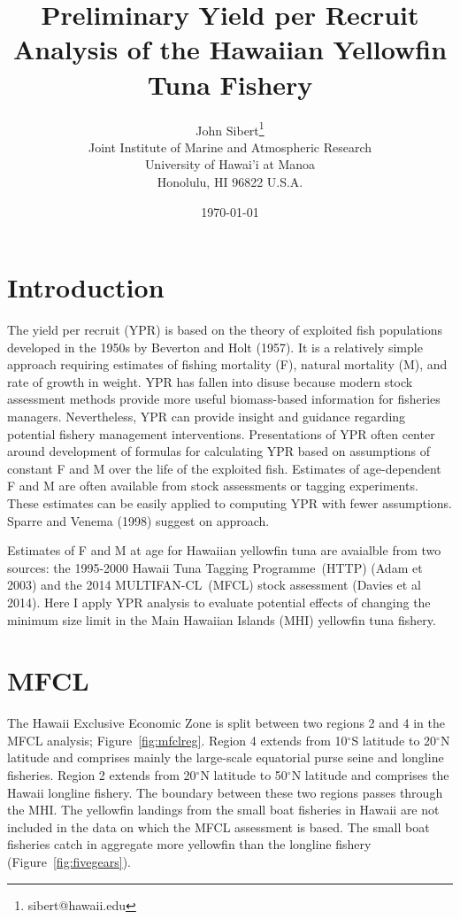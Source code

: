 \documentclass[12pt,letterpaper]{article}
\title{Preliminary Yield per Recruit Analysis of the Hawaiian
Yellowfin Tuna Fishery}
\author{
John Sibert\thanks{sibert@hawaii.edu}\\
Joint Institute of Marine and Atmospheric Research\\
University of Hawai'i at Manoa\\
Honolulu, HI  96822 U.S.A.\\[0.125in]
\date{\today}
}
\newcommand\doublespacing{\baselineskip=1.6\normalbaselineskip}
\renewcommand\deg[1]{$^\circ$#1}
\newcommand\MFCL{MULTIFAN-CL}
\newcommand\HTTP{Hawaii Tuna Tagging Programme}
\newcommand\help[1]{\color{Magenta}{\it #1 }\normalcolor}
\begin{document}
\maketitle

\doublespacing

\section*{Introduction}
The yield per recruit (YPR) is based on the theory of exploited fish
populations developed in the 1950s
by Beverton and Holt (1957). It is a relatively simple
approach requiring estimates of fishing mortality (F), natural
mortality (M), and rate of growth in weight. YPR has fallen into
disuse because modern stock assessment methods provide more useful
biomass-based
information for fisheries managers. 
Nevertheless, YPR can provide insight and guidance regarding potential
fishery management interventions.
Presentations of
YPR often center around development of formulas for calculating YPR based on
assumptions of constant F and M over the life of the exploited fish.
Estimates of age-dependent F and M are often available from stock
assessments or tagging experiments. These estimates can be easily
applied to computing YPR with fewer assumptions. Sparre and Venema
(1998) suggest on approach.

Estimates of F and M at age for Hawaiian yellowfin tuna are avaialble
from two sources: the 1995-2000 \HTTP\ (HTTP) (Adam et 2003) and the
2014 \MFCL\ (MFCL) stock assessment (Davies et al 2014). Here I
apply YPR analysis to evaluate potential effects of changing the
minimum size limit in the Main Hawaiian Islands (MHI) yellowfin tuna
fishery.

\section*{MFCL}
The Hawaii Exclusive Economic Zone is split between two regions 2 and 4
in the MFCL analysis; Figure~\ref{fig:mfclreg}. 
Region 4 extends from
10\deg{S} latitude to 20\deg{N} latitude and comprises mainly
the large-scale equatorial purse seine and longline fisheries.
Region 2 extends from 20\deg{N} latitude to 50\deg{N} latitude
and comprises the Hawaii longline fishery.
The boundary between these two regions passes through the MHI. 
The yellowfin landings from the small boat fisheries in Hawaii are not
included in the data on which the MFCL assessment is based.
The small boat fisheries catch in aggregate more yellowfin than the longline
fishery (Figure~\ref{fig:fivegears})\help{or simple table}.
\end{document}
